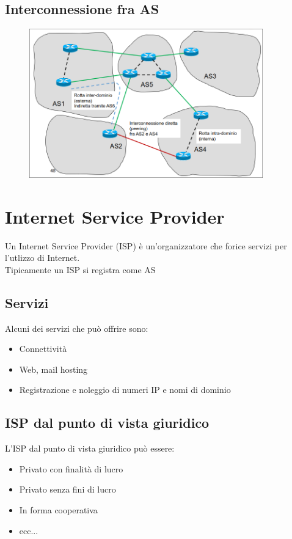 \documentclass{report}
\begin{document}
            \subsection{Interconnessione fra AS}
                \begin{figure}[H]
                    \includegraphics[width=0.9\textwidth]{3/interc.png}
                \end{figure}
        \section{Internet Service Provider}
            Un Internet Service Provider (ISP) è un'organizzatore che forice servizi per l'utlizzo di Internet.
            \\
            Tipicamente un ISP si registra come AS
            \subsection{Servizi}
                Alcuni dei servizi che può offrire sono:
                \begin{itemize}
                    \item Connettività
                    \item Web, mail hosting
                    \item Registrazione e noleggio di numeri IP e nomi di dominio
                \end{itemize}
            \subsection{ISP dal punto di vista giuridico}
                L'ISP dal punto di vista giuridico può essere:
                \begin{itemize}
                    \item Privato con finalità di lucro
                    \item Privato senza fini di lucro
                    \item In forma cooperativa
                    \item ecc...
                \end{itemize}
\end{document}
